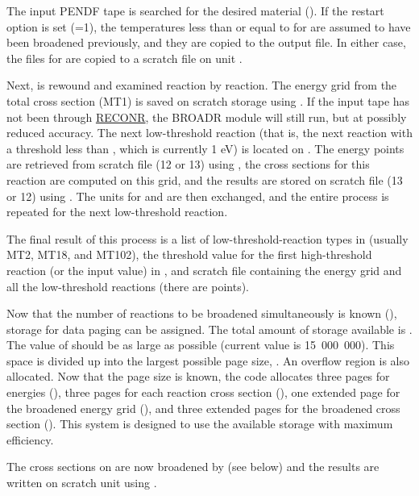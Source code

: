 The input PENDF tape is searched for the desired material
().  If the restart option is set (=1),
the temperatures less than or equal to  for
 are assumed to have been broadened previously, and
they are copied to the output file.  In either case, the files
for  are copied to a scratch file on unit
.

Next,  is rewound and examined reaction by
reaction.  The energy grid from the total cross section (MT1) is
saved on scratch storage using .  If the input tape
has not been through \hyperlink{sRECONRhy}{RECONR},
the BROADR module will
still run, but at possibly reduced accuracy.  The next low-threshold
reaction (that is, the next reaction with a threshold less than
, which is currently 1 eV) is located on
.  The energy points are retrieved from scratch file
 (12 or 13) using , the cross sections
for this reaction are computed on this grid, and the results are
stored on scratch file  (13 or 12) using
.  The units for  and  are
then exchanged, and the entire process is repeated for the next
low-threshold reaction.

The final result of this process is a list of 
low-threshold-reaction types in  (usually MT2, MT18,
and MT102), the threshold value for the first high-threshold
reaction (or the input value) in , and scratch file
 containing the energy grid and all the low-threshold
reactions (there are  points).

Now that the number of reactions to be broadened simultaneously
is known (), storage for data paging can be assigned.
The total amount of storage available is .  The value
of  should be as large as possible (current value
is 15\ 000\ 000).  This space is divided up into the largest possible
page size, .  An overflow region  is also
allocated.  Now that the page size is known, the code allocates three
pages for energies (), three pages for each reaction
cross section (), one extended page for the broadened
energy grid (), and three extended pages for the
broadened cross section ().  This system is designed to
use the available storage with maximum efficiency.

The cross sections on  are now broadened by
 (see below) and the results
are written on scratch unit  using .

